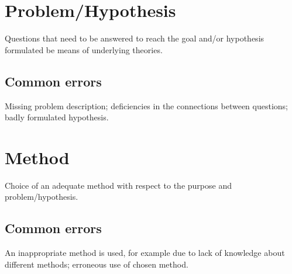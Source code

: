     \section{Problem/Hypothesis} 
    Questions that need to be answered to reach 
    the goal and/or hypothesis formulated be means of 
    underlying theories. 
    \subsection{Common errors}
    Missing problem description; deficiencies in the connections between questions; badly formulated 
    hypothesis.  
    
    \section{Method} 
    Choice of an adequate method with respect to the 
    purpose and problem/hypothesis. 
    
    \subsection{Common errors}
    An inappropriate method is used, for example due to lack of knowledge about different methods; 
    erroneous use of chosen method.  
\fi